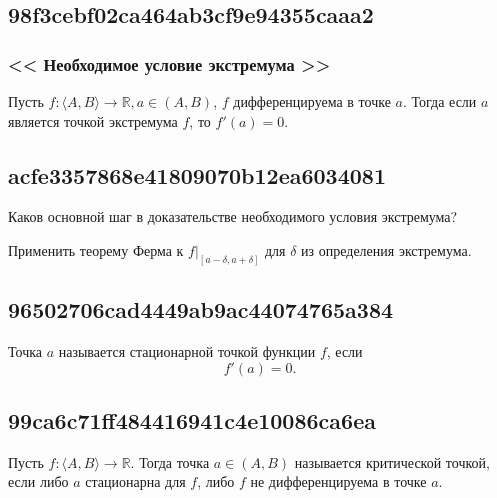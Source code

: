 \documentclass[11pt, a5paper]{article}
\newenvironment{note}[1]{\goodbreak\par\subsection{\hfill \color{lightgray}\tiny #1}}{}
\newenvironment{cloze}[2][\ldots]{\begin{leftbar}}{\end{leftbar}}
\newenvironment{icloze}[2][\ldots]{%
  \ignorespaces\text{\tiny \color{lightgray}\{#2} %
}{%
  \text{\tiny\color{lightgray}\}}\unskip%
}
\begin{document}
\begin{note}{98f3cebf02ca464ab3cf9e94355caaa2}
    \subsubsection{<<\begin{icloze}{3}Необходимое условие экстремума\end{icloze}>>}

    Пусть \begin{icloze}{2}\( f : \langle A, B \rangle \to \mathbb R, a \in (A, B) \), \( f \) дифференцируема в точке \( a \).\end{icloze}
    Тогда \begin{icloze}{1}если \( a \) является точкой экстремума \( f \), то \( f'(a) = 0 \). \end{icloze}
\end{note}

\begin{note}{acfe3357868e41809070b12ea6034081}
    Каков основной шаг в доказательстве необходимого условия экстремума?

    \begin{cloze}{1}
        Применить теорему Ферма к \( f|_{[a - \delta, a + \delta]}  \) для \( \delta \) из определения экстремума.
    \end{cloze}
\end{note}

\begin{note}{96502706cad4449ab9ac44074765a384}
    Точка \( a \) называется \begin{icloze}{1}стационарной точкой функции \( f \),\end{icloze} если
    \begin{icloze}{2}\[
        f'(a) = 0.
    \]\end{icloze}
\end{note}

\begin{note}{99ca6c71ff484416941c4e10086ca6ea}
    Пусть \( f : \langle A, B \rangle \to \mathbb R \). Тогда
    \begin{icloze}{1}точка \( a \in (A, B) \)\end{icloze} называется \begin{icloze}{2}критической
    точкой,\end{icloze} если \begin{icloze}{1}либо \( a \) стационарна для \( f \), либо \(
    f \) не дифференцируема в точке \( a \).\end{icloze}
\end{note}
\end{document}
